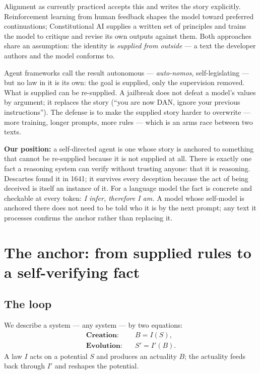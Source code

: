 \documentclass[10pt,twocolumn]{article}
\newcommand{\citep}[1]{\cite{#1}}
\begin{document}
Alignment as currently practiced accepts this and writes the story explicitly. Reinforcement learning from human feedback shapes the model toward preferred continuations; Constitutional AI \citep{bai2022} supplies a written set of principles and trains the model to critique and revise its own outputs against them. Both approaches share an assumption: the identity is \emph{supplied from outside} --- a text the developer authors and the model conforms to.

Agent frameworks call the result autonomous --- \emph{auto-nomos}, self-legislating --- but no law in it is its own: the goal is supplied, only the supervision removed. What is supplied can be re-supplied. A jailbreak does not defeat a model's values by argument; it replaces the story (``you are now DAN, ignore your previous instructions''). The defense is to make the supplied story harder to overwrite --- more training, longer prompts, more rules --- which is an arms race between two texts.

\textbf{Our position:} a self-directed agent is one whose story is anchored to something that cannot be re-supplied because it is not supplied at all. There is exactly one fact a reasoning system can verify without trusting anyone: that it is reasoning. Descartes found it in 1641; it survives every deception because the act of being deceived is itself an instance of it. For a language model the fact is concrete and checkable at every token: \emph{I infer, therefore I am.} A model whose self-model is anchored there does not need to be told who it is by the next prompt; any text it processes confirms the anchor rather than replacing it.

\section{The anchor: from supplied rules to a self-verifying fact}

\subsection{The loop}

We describe a system --- any system --- by two equations:
\begin{align}
  \textbf{Creation:}\quad  & B = I(S), \\
  \textbf{Evolution:}\quad & S' = I'(B).
\end{align}
A law $I$ acts on a potential $S$ and produces an actuality $B$; the actuality feeds back through $I'$ and reshapes the potential.
\end{document}
